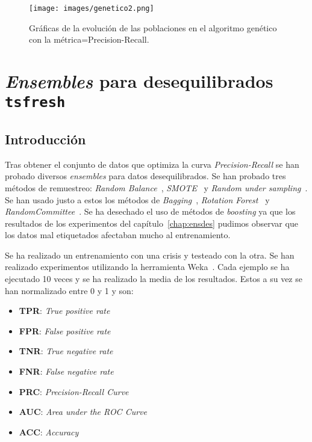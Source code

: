 \documentclass[a4paper,12pt,twoside,oldfontcommands]{memoir}
\begin{document}
\begin{figure}
    \centering
    \texttt{[image: images/genetico2.png]}
    \caption{Gráficas de la evolución de las poblaciones en el algoritmo genético con la métrica=Precision-Recall.}
    \label{fig:genetico2}
\end{figure}

\chapter{\textit{Ensembles} para desequilibrados \texttt{tsfresh}}
\section{Introducción}
Tras obtener el conjunto de datos que optimiza la curva \textit{Precision-Recall} se han probado diversos \textit{ensembles} para datos desequilibrados. Se han probado tres métodos de remuestreo: \textit{Random Balance}~\cite{diez2015random}, \textit{SMOTE}~\cite{galar2012review} y \textit{Random under sampling}~\cite{diez2015diversity}. Se han usado justo a estos los métodos de \textit{Bagging}~\cite{galar2012review}, \textit{Rotation Forest}~\cite{rodriguez2006rotation} y \textit{RandomCommittee}~\cite{diez2015diversity}. Se ha desechado el uso de métodos de \textit{boosting} ya que los resultados de los experimentos del capítulo~\ref{chap:ensdes} pudimos observar que los datos mal etiquetados afectaban mucho al entrenamiento.

Se ha realizado un entrenamiento con una crisis y testeado con la otra. Se han realizado experimentos utilizando la herramienta Weka~\cite{hall2009weka}. Cada ejemplo se ha ejecutado 10 veces y se ha realizado la media de los resultados. Estos a su vez se han normalizado entre 0 y 1 y son: 
\begin{itemize}
    \item \textbf{TPR}: \textit{True positive rate}
    \item \textbf{FPR}: \textit{False positive rate}
    \item \textbf{TNR}: \textit{True negative rate}
    \item \textbf{FNR}: \textit{False negative rate}
    \item \textbf{PRC}: \textit{Precision-Recall Curve}
    \item \textbf{AUC}: \textit{Area under the ROC Curve}
    \item \textbf{ACC}: \textit{Accuracy}
\end{itemize}
\end{document}
